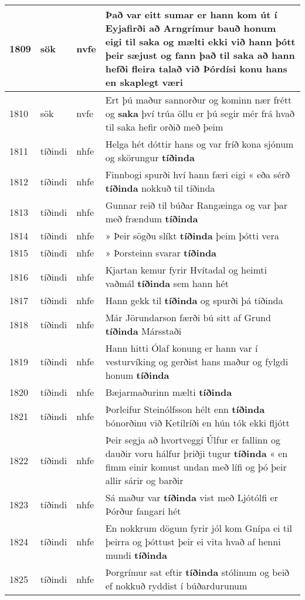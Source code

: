 \documentclass{article}
\begin{document}
\begin{longtable}{p{1cm}|p{1cm}|p{1cm}|p{13cm}}
\hline
1809&sök&nvfe&Það var eitt sumar er hann kom út í Eyjafirði að Arngrímur bauð honum eigi til \textbf{saka} og mælti ekki við hann þótt þeir sæjust og fann það til saka að hann hefði fleira talað við Þórdísi konu hans en skaplegt væri\\
\hline
1810&sök&nvfe&Ert þú maður sannorður og kominn nær frétt og \textbf{saka} því trúa öllu er þú segir mér frá hvað til saka hefir orðið með þeim\\
\hline
1811&tíðindi&nhfe&Helga hét dóttir hans og var fríð kona sjónum og skörungur \textbf{tíðinda} \\
\hline
1812&tíðindi&nhfe&Finnbogi spurði hví hann færi eigi « eða sérð \textbf{tíðinda} nokkuð til tíðinda\\
\hline
1813&tíðindi&nhfe&Gunnar reið til búðar Rangæinga og var þar með frændum \textbf{tíðinda} \\
\hline
1814&tíðindi&nhfe&» Þeir sögðu slíkt \textbf{tíðinda} þeim þótti vera\\
\hline
1815&tíðindi&nhfe&» Þorsteinn svarar \textbf{tíðinda} \\
\hline
1816&tíðindi&nhfe&Kjartan kemur fyrir Hvítadal og heimti vaðmál \textbf{tíðinda} sem hann hét\\
\hline
1817&tíðindi&nhfe&Hann gekk til \textbf{tíðinda} og spurði þá tíðinda\\
\hline
1818&tíðindi&nhfe&Már Jörundarson færði bú sitt af Grund \textbf{tíðinda} Mársstaði\\
\hline
1819&tíðindi&nhfe&Hann hitti Ólaf konung er hann var í vesturvíking og gerðist hans maður og fylgdi honum \textbf{tíðinda} \\
\hline
1820&tíðindi&nhfe&Bæjarmaðurinn mælti \textbf{tíðinda} \\
\hline
1821&tíðindi&nhfe&Þorleifur Steinólfsson hélt enn \textbf{tíðinda} bónorðinu við Ketilríði en hún tók ekki fljótt\\
\hline
1822&tíðindi&nhfe&Þeir segja að hvortveggi Úlfur er fallinn og dauðir voru hálfur þriðji tugur \textbf{tíðinda} « en fimm einir komust undan með lífi og þó þeir allir sárir og barðir\\
\hline
1823&tíðindi&nhfe&Sá maður var \textbf{tíðinda} vist með Ljótólfi er Þórður fangari hét\\
\hline
1824&tíðindi&nhfe&En nokkrum dögum fyrir jól kom Gnípa ei til þeirra og þóttust þeir ei vita hvað af henni mundi \textbf{tíðinda} \\
\hline
1825&tíðindi&nhfe&Þorgrímur sat eftir \textbf{tíðinda} stólinum og beið ef nokkuð ryddist í búðardurunum\\

\end{longtable}
\end{document}
